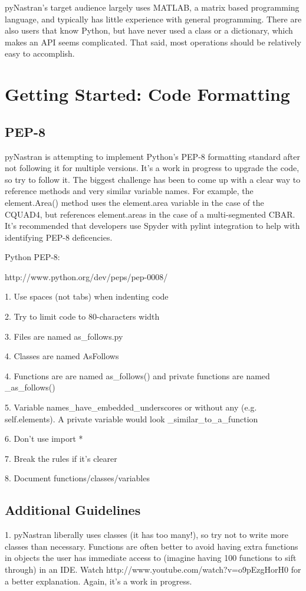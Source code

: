      pyNastran's target audience largely uses MATLAB, a matrix based programming language, and typically has little experience with general programming.  There are also users that know Python, but have never used a class or a dictionary, which makes an API seems complicated.  That said, most operations should be relatively easy to accomplish.


\section{Getting Started: Code Formatting}
 \subsection{PEP-8}
     pyNastran is attempting to implement Python's PEP-8 formatting standard after not following it for multiple versions.  It's a work in progress to upgrade the code, so try to follow it.  The biggest challenge has been to come up with a clear way to reference methods and very similar variable names.  For example, the element.Area() method uses the element.area variable in the case of the CQUAD4, but references element.areas in the case of a multi-segmented CBAR.  It's recommended that developers use Spyder with pylint integration to help with identifying PEP-8 deficencies.

    Python PEP-8:

     http://www.python.org/dev/peps/pep-0008/

     1.  Use spaces (not tabs) when indenting code

     2.  Try to limit code to 80-characters width

     3.  Files are named as\_follows.py

     4.  Classes are named AsFollows

     4.  Functions are are named as\_follows() and private functions are named \_as\_follows()

     5.  Variable names\_have\_embedded\_underscores or without any (e.g. self.elements).  A private variable would look \_similar\_to\_a\_function

     6.  Don't use import *

     7.  Break the rules if it's clearer

     8.  Document functions/classes/variables

 \subsection{Additional Guidelines}
     1.  pyNastran liberally uses classes (it has too many!), so try not to write more classes than necessary.  Functions are often better to avoid having extra functions in objects the user has immediate access to (imagine having 100 functions to sift through) in an IDE.  Watch http://www.youtube.com/watch?v=o9pEzgHorH0 for a better explanation.  Again, it's a work in progress.


